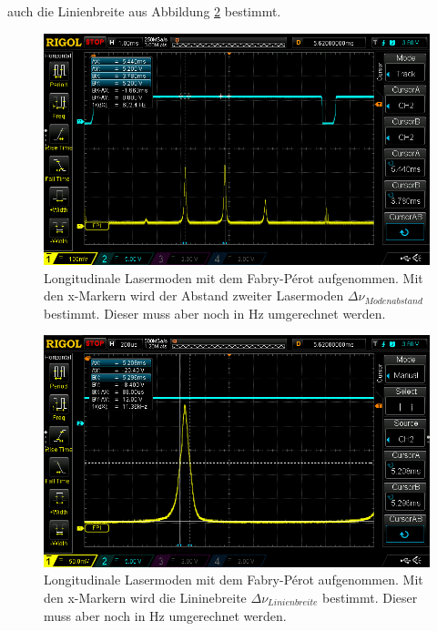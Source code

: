 auch die Linienbreite aus Abbildung \ref{bild:Lininebreite} bestimmt.

\begin{figure}[ht]
    \centering
    \includegraphics[width = \linewidth]{Bilder/Auswertung/FabryPerotModenAbstand.png}
    \caption{Longitudinale Lasermoden mit dem Fabry-Pérot aufgenommen. Mit den x-Markern wird der Abstand zweiter Lasermoden $\Delta \nu_{Modenabstand}$ bestimmt. Dieser muss aber noch in Hz umgerechnet werden.}
    \label{bild:AxialModenAbstand}
\end{figure}

\begin{figure}[ht]
    \centering
    \includegraphics[width = \linewidth]{Bilder/Auswertung/FabryPerotLinienbreite.png}
    \caption{Longitudinale Lasermoden mit dem Fabry-Pérot aufgenommen. Mit den x-Markern wird die Lininebreite $\Delta \nu_{Linienbreite}$ bestimmt. Dieser muss aber noch in Hz umgerechnet werden.}
    \label{bild:Lininebreite}
\end{figure}